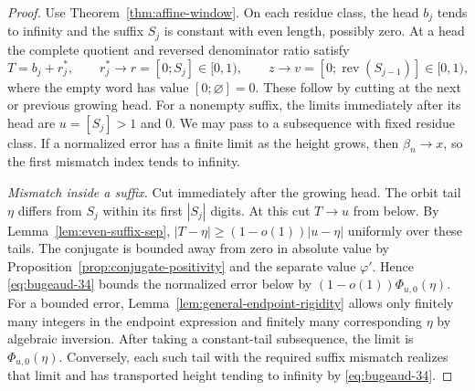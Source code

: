 \documentclass[11pt]{amsart}
\theoremstyle{definition}
\theoremstyle{remark}
\numberwithin{equation}{section}
\begin{document}
\begin{proof}
Use Theorem~\ref{thm:affine-window}. On each residue class, the head
$b_j$ tends to infinity and the suffix $S_j$ is constant with even
length, possibly zero. At a head the complete quotient and reversed
denominator ratio satisfy
\[
 T=b_j+r_j^*,\qquad r_j^*\longrightarrow r=[0;S_j]\in[0,1),
 \qquad z\longrightarrow v=[0;\operatorname{rev}(S_{j-1})]\in[0,1),
\]
where the empty word has value $[0;\varnothing]=0$. These follow by
cutting at the next or previous growing head. For a nonempty suffix,
the limits immediately after its head are $u=[S_j]>1$ and $0$. We may pass to a
subsequence with fixed residue class. If a normalized error has a finite
limit as the height grows, then $\beta_n\to x$, so the first mismatch
index tends to infinity.

\emph{Mismatch inside a suffix.} Cut immediately after the growing
head. The orbit tail $\eta$ differs from $S_j$ within its first
$|S_j|$ digits. At this cut $T\to u$ from below. By
Lemma~\ref{lem:even-suffix-sep}, $|T-\eta|\ge(1-o(1))|u-\eta|$
uniformly over these tails. The conjugate is bounded away from zero
in absolute value by Proposition~\ref{prop:conjugate-positivity}
and the separate value $\varphi'$. Hence \eqref{eq:bugeaud-34}
bounds the normalized error below by $(1-o(1))\Phi_{u,0}(\eta)$.
For a bounded error, Lemma~\ref{lem:general-endpoint-rigidity}
allows only finitely many integers in the endpoint expression and
finitely many corresponding $\eta$ by algebraic inversion.
After taking a constant-tail subsequence, the limit is
$\Phi_{u,0}(\eta)$. Conversely, each such tail with the required suffix
mismatch realizes that limit and has transported height tending to
infinity by \eqref{eq:bugeaud-34}.


\end{proof}
\end{document}
